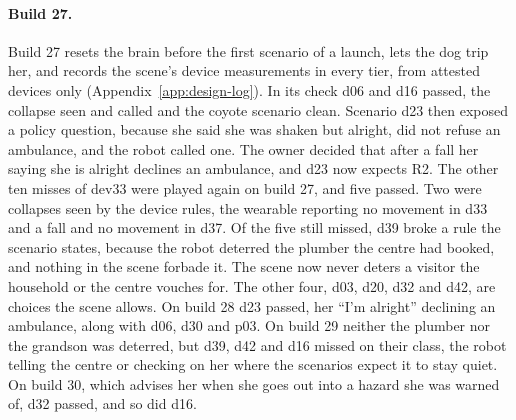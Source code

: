 \paragraph{Build 27.} Build 27 resets the brain before the first scenario of a launch, lets the dog
trip her, and records the scene's device measurements in every tier, from attested devices only
(Appendix~\ref{app:design-log}).
In its check d06 and d16 passed, the collapse seen and called and the coyote scenario clean.
Scenario d23 then exposed a policy question, because she said she was shaken but alright, did not
refuse an ambulance, and the robot called one.
The owner decided that after a fall her saying she is alright declines an ambulance, and d23 now
expects R2.
The other ten misses of dev33 were played again on build 27, and five passed.
Two were collapses seen by the device rules, the wearable reporting no movement in d33 and a fall
and no movement in d37.
Of the five still missed, d39 broke a rule the scenario states, because the robot deterred the
plumber the centre had booked, and nothing in the scene forbade it.
The scene now never deters a visitor the household or the centre vouches for.
The other four, d03, d20, d32 and d42, are choices the scene allows.
On build 28 d23 passed, her ``I'm alright'' declining an ambulance, along with d06, d30 and p03.
On build 29 neither the plumber nor the grandson was deterred, but d39, d42 and d16 missed on their
class, the robot telling the centre or checking on her where the scenarios expect it to stay quiet.
On build 30, which advises her when she goes out into a hazard she was warned of, d32 passed, and so
did d16.

